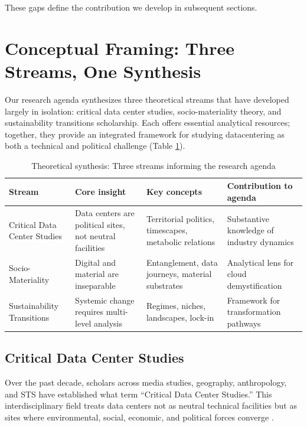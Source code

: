 \documentclass[review]{elsarticle}
\begin{document}
These gaps define the contribution we develop in subsequent sections.

\section{Conceptual Framing: Three Streams, One Synthesis}

Our research agenda synthesizes three theoretical streams that have developed largely in isolation: critical data center studies, socio-materiality theory, and sustainability transitions scholarship. Each offers essential analytical resources; together, they provide an integrated framework for studying datacentering as both a technical and political challenge (Table \ref{tab:theoretical}).

\begin{table}[h]
\caption{Theoretical synthesis: Three streams informing the research agenda}
\label{tab:theoretical}
\begin{tabular}{p{2.8cm}p{3.5cm}p{3cm}p{3cm}}
\toprule
\textbf{Stream} & \textbf{Core insight} & \textbf{Key concepts} & \textbf{Contribution to agenda} \\
\midrule
Critical Data Center Studies & Data centers are political sites, not neutral facilities & Territorial politics, timescapes, metabolic relations & Substantive knowledge of industry dynamics \\
\addlinespace
Socio-Materiality & Digital and material are inseparable & Entanglement, data journeys, material substrates & Analytical lens for cloud demystification \\
\addlinespace
Sustainability Transitions & Systemic change requires multi-level analysis & Regimes, niches, landscapes, lock-in & Framework for transformation pathways \\
\bottomrule
\end{tabular}
\end{table}

\subsection{Critical Data Center Studies}

Over the past decade, scholars across media studies, geography, anthropology, and STS have established what \citet{Edwards2025} term ``Critical Data Center Studies.'' This interdisciplinary field treats data centers not as neutral technical facilities but as sites where environmental, social, economic, and political forces converge \citep{Hogan2015, Velkova2023}.
\end{document}
